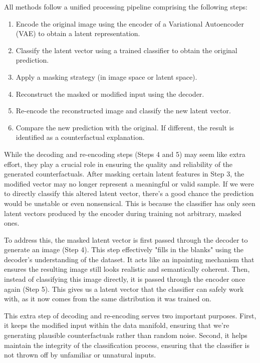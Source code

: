 All methods follow a unified processing pipeline comprising the following steps:

\begin{enumerate}
    \item Encode the original image using the encoder of a Variational Autoencoder (VAE) to obtain a latent representation.
    \item Classify the latent vector using a trained classifier to obtain the original prediction.
    \item Apply a masking strategy (in image space or latent space).
    \item Reconstruct the masked or modified input using the decoder.
    \item Re-encode the reconstructed image and classify the new latent vector.
    \item Compare the new prediction with the original. If different, the result is identified as a counterfactual explanation.
\end{enumerate}

While the decoding and re-encoding steps (Steps 4 and 5) may seem like extra effort, they play a crucial role in ensuring the quality and reliability of the generated counterfactuals. After masking certain latent features in Step 3, the modified vector may no longer represent a meaningful or valid sample. If we were to directly classify this altered latent vector, there’s a good chance the prediction would be unstable or even nonsensical. This is because the classifier has only seen latent vectors produced by the encoder during training not arbitrary, masked ones.

To address this, the masked latent vector is first passed through the decoder to generate an image (Step 4). This step effectively "fills in the blanks" using the decoder’s understanding of the dataset. It acts like an inpainting mechanism that ensures the resulting image still looks realistic and semantically coherent. Then, instead of classifying this image directly, it is passed through the encoder once again (Step 5). This gives us a latent vector that the classifier can safely work with, as it now comes from the same distribution it was trained on.

This extra step of decoding and re-encoding serves two important purposes. First, it keeps the modified input within the data manifold, ensuring that we're generating plausible counterfactuals rather than random noise. Second, it helps maintain the integrity of the classification process, ensuring that the classifier is not thrown off by unfamiliar or unnatural inputs.

